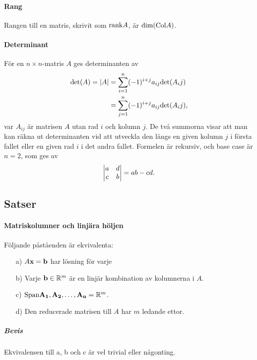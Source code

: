 \paragraph{Rang}
Rangen till en matris, skrivit som $\text{rank} A$, är $\text{dim}(\text{Col} A)$.

\paragraph{Determinant}
För en $n\times n$-matris $A$ ges determinanten av
\begin{align*}
	\text{det}(A) = \abs{A} &= \sum\limits_{i = 1}^{n}(-1)^{i + j}a_{ij}\text{det}(A_ij) \\
	&= \sum\limits_{j = 1}^{n}(-1)^{i + j}a_{ij}\text{det}(A_ij),
\end{align*}
var $A_{ij}$ är matrisen $A$ utan rad $i$ och kolumn $j$. De två summorna visar att man kan räkna ut determinanten vid att utveckla den långs en given kolumn $j$ i första fallet eller en given rad $i$ i det andra fallet. Formelen är rekursiv, och base case är $n=2$, som ges av
\begin{align*}
	\mdet{a & d \\ c & b} = ab - cd.
\end{align*}

\subsection{Satser}

\paragraph{Matriskolumner och linjära höljen}
Följande påståenden är ekvivalenta:
\begin{itemize}
	\item[a)] $A\vectorbold{x} = \vect{b}$ har lösning för varje
	\item[b)] Varje $\vect{b}\in \R^{m}$ är en linjär kombination av kolumnerna i $A$.
	\item[c)] $\Span{\vect{A_1}, \vect{A_2}, \dots, \vect{A_n}} = \R^m$.
	\item[d)] Den reducerade matrisen till $A$ har $m$ ledande ettor.
\end{itemize}

\subparagraph{Bevis}
Ekvivalensen till a, b och c är vel trivial eller någonting.

